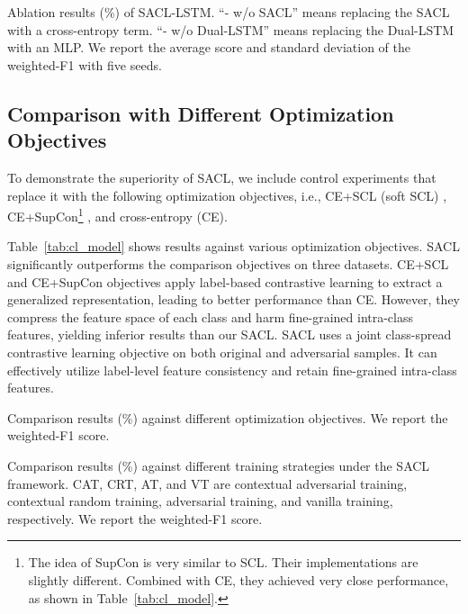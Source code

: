 \documentclass[11pt]{article}
\begin{document}
\begin{table}[t]
    \centering
    \resizebox{\linewidth}{!}{\pm\pm\pm\pm\pm\pm\pm\pm\pm}
    \caption{
    Ablation results (\%) of SACL-LSTM.
    ``- w/o SACL'' means replacing the SACL with a cross-entropy term.
    ``- w/o Dual-LSTM'' means replacing the Dual-LSTM with an MLP.
    We report the average score and standard deviation of the weighted-F1 with five seeds.
    }
    \label{tab:abla}
\end{table}

\subsection{Comparison with Different Optimization Objectives}
To demonstrate the superiority of SACL, we include control experiments that replace it with the following optimization objectives, i.e., CE+SCL (soft SCL) \citep{gunel2020supervised}, CE+SupCon\footnote{The idea of SupCon is very similar to SCL. Their implementations are slightly different. Combined with CE, they achieved very close performance, as shown in Table~\ref{tab:cl_model}.}
\cite{khosla2020supervised}, and cross-entropy (CE). 

Table~\ref{tab:cl_model} shows results against various optimization objectives.
SACL significantly outperforms the comparison objectives on three datasets. 
CE+SCL and CE+SupCon objectives apply label-based contrastive learning to extract a generalized representation, leading to better performance than CE.
However, they compress the feature space of each class and harm fine-grained intra-class features, yielding inferior results than our SACL.
SACL uses a joint class-spread contrastive learning objective on both original and adversarial samples. It can effectively utilize label-level feature consistency and retain fine-grained intra-class features.

\begin{table}[t]
\centering
    \resizebox{0.83\linewidth}{!}{\pm\pm\pm\pm\pm\pm\pm\pm\pm\pm\pm\pm}
\caption{Comparison results (\%) against different optimization objectives. 
We report the weighted-F1 score.
  }
 \label{tab:cl_model}
\end{table}


\begin{table}[t]
\centering
    \resizebox{0.8\linewidth}{!}{\pm\pm\pm\pm\pm\pm\pm\pm\pm\pm\pm\pm}
\caption{Comparison results (\%) against different training strategies under the SACL framework.
CAT, CRT, AT, and VT are contextual adversarial training, contextual random training, adversarial training, and vanilla training, respectively.
We report the weighted-F1 score.
}
  \label{tab:perturbations}
\end{table}
\end{document}
